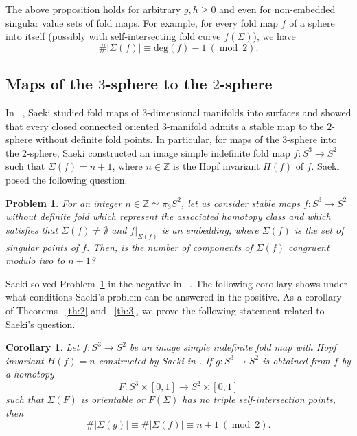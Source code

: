 \documentclass[12pt]{amsart}
\def \Z{\mathbb{Z}}
\def\co{\colon}
\def\mod{{\mathop\mathrm{mod}\ }}
\newtheorem{corollary}[theorem]{Corollary}
\newtheorem{problem}[theorem]{Problem}
\theoremstyle{definition}
\begin{document}
{The above proposition holds for arbitrary $g,h \geq 0$ and even for non-embedded singular value sets of fold maps. For example, for every fold map $f$ of a sphere into itself (possibly with self-intersecting fold curve $f(\Sigma)$), we have 
\[
   \#|\Sigma(f)| \equiv \mathrm{deg}(f) - 1 ~(\mod 2).
\]



\subsection{Maps of the $3$-sphere to the $2$-sphere} 

In ~\cite{Sae},  Saeki studied fold maps of $3$-dimensional manifolds into surfaces and showed that every closed connected oriented $3$-manifold admits a stable map to the $2$-sphere without definite fold points. In particular,  for maps of the $3$-sphere into the $2$-sphere, Saeki constructed an image simple indefinite fold map $f:S^3 \rightarrow S^2$ such that $\Sigma(f) = n+1$, where $n \in \Z$ is the Hopf invariant $H(f)$ of $f$. Saeki posed the following question. 

\begin{problem}\label{p:2} For an integer $n\in \Z\simeq \pi_3S^2$, let us consider stable maps $f\co S^3\to S^2$ without definite fold which represent the associated homotopy class and which satisfies that $\Sigma(f)\ne \emptyset$ and $f|_{\Sigma(f)}$ is an embedding, where $\Sigma(f)$ is the set of singular points of $f$. Then, is the number of components of $\Sigma(f)$ congruent modulo two to $n+1$?
\end{problem}
 Saeki solved Problem~\ref{p:2} in the negative in ~\cite{Sae19}. The following corollary shows under what conditions Saeki's problem can be answered in the positive. 
\noindent As a corollary of Theorems ~\ref{th:2} and ~\ref{th:3}, we prove the following statement related to Saeki's question.

\begin{corollary}\label{cor:1a}
Let $f:S^3 \rightarrow S^2$ be an image simple indefinite fold map with Hopf invariant $H(f) = n$ constructed by Saeki in \cite{Sae}. If $g:S^3 \rightarrow S^2$ is obtained from $f$ by a homotopy \[ F:S^3 \times [0,1] \rightarrow S^2 \times [0,1] \]   such that $\Sigma(F)$ is orientable or $F(\Sigma)$ has no triple self-intersection points,
then  
\[
\#|\Sigma(g)| \equiv \#|\Sigma(f)| \equiv n+1 ~(\mod 2).
\]
\end{corollary} 




}
\end{document}
